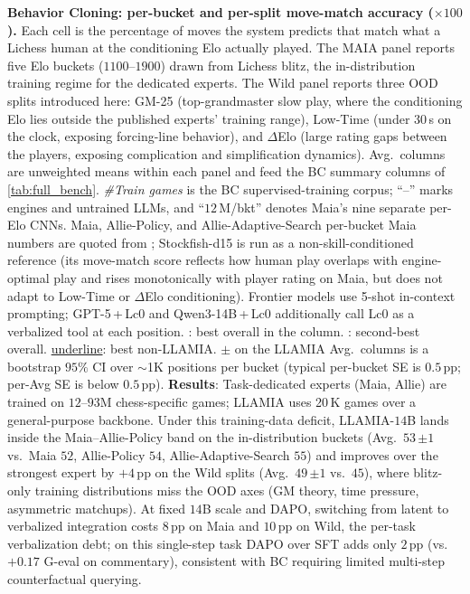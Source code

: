 \begin{table}[h!]
\centering
\caption{\textbf{Behavior Cloning: per-bucket and per-split move-match accuracy ($\times 100$).}
Each cell is the percentage of moves the system predicts that match what a Lichess human at the conditioning Elo actually played.
The MAIA panel reports five Elo buckets ($1100$--$1900$) drawn from Lichess blitz, the in-distribution training regime for the dedicated experts.
The Wild panel reports three OOD splits introduced here: GM-25 (top-grandmaster slow play, where the conditioning Elo lies outside the published experts' training range), Low-Time (under $30$\,s on the clock, exposing forcing-line behavior), and $\Delta$Elo (large rating gaps between the players, exposing complication and simplification dynamics).
Avg.\ columns are unweighted means within each panel and feed the BC summary columns of \cref{tab:full_bench}.
\emph{\#Train games} is the BC supervised-training corpus; ``--'' marks engines and untrained LLMs, and ``$12$\,M/bkt'' denotes Maia's nine separate per-Elo CNNs.
Maia, Allie-Policy, and Allie-Adaptive-Search per-bucket Maia numbers are quoted from \citet{mcilroy2022aligning, zhang2024humanalignedchessbitsearch}; Stockfish-d15 is run as a non-skill-conditioned reference (its move-match score reflects how human play overlaps with engine-optimal play and rises monotonically with player rating on Maia, but does not adapt to Low-Time or $\Delta$Elo conditioning). Frontier models use 5-shot in-context prompting; GPT-5\,+\,Lc0 and Qwen3-14B\,+\,Lc0 additionally call Lc0 as a verbalized tool at each position.
: best overall in the column.
: second-best overall.
\underline{underline}: best non-LLAMIA.
$\pm$ on the LLAMIA Avg.\ columns is a bootstrap $95\%$ CI over $\sim$1K positions per bucket (typical per-bucket SE is $0.5$\,pp; per-Avg SE is below $0.5$\,pp).
\textbf{Results}: Task-dedicated experts (Maia, Allie) are trained on $12$--$93$M chess-specific games; LLAMIA uses 20\,K games over a general-purpose backbone. Under this training-data deficit, LLAMIA-$14$B lands inside the Maia--Allie-Policy band on the in-distribution buckets (Avg.\ $53\,{\scriptstyle\pm 1}$ vs.\ Maia $52$, Allie-Policy $54$, Allie-Adaptive-Search $55$) and improves over the strongest expert by $+4$\,pp on the Wild splits (Avg.\ $49\,{\scriptstyle\pm 1}$ vs.\ $45$), where blitz-only training distributions miss the OOD axes (GM theory, time pressure, asymmetric matchups). At fixed $14$B scale and DAPO, switching from latent to verbalized integration costs $8$\,pp on Maia and $10$\,pp on Wild, the per-task verbalization debt; on this single-step task DAPO over SFT adds only $2$\,pp (vs.\ $+0.17$ G-eval on commentary), consistent with BC requiring limited multi-step counterfactual querying.}

\end{table}
